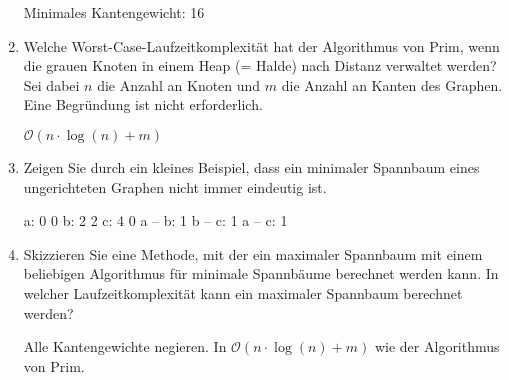 \documentclass{lehramt-informatik-aufgabe}
\begin{document}
\begin{enumerate}
\begin{liAntwort}
\begin{center}
\end{center}
Minimales Kantengewicht: 16
\end{liAntwort}


\item Welche Worst-Case-Laufzeitkomplexität hat der Algorithmus von
Prim, wenn die grauen Knoten in einem Heap (= Halde) nach Distanz
verwaltet werden? Sei dabei $n$ die Anzahl an Knoten und $m$ die Anzahl
an Kanten des Graphen. Eine Begründung ist nicht erforderlich.

\begin{liAntwort}
$\mathcal{O}(n \cdot \log(n) + m)$
\end{liAntwort}


\item Zeigen Sie durch ein kleines Beispiel, dass ein minimaler
Spannbaum eines ungerichteten Graphen nicht immer eindeutig ist.

\begin{liGraphenFormat}
a: 0 0
b: 2 2
c: 4 0
a -- b: 1
b -- c: 1
a -- c: 1
\end{liGraphenFormat}

\begin{liAntwort}
\hspace{0.5cm}
\hspace{0.5cm}
\end{liAntwort}


\item Skizzieren Sie eine Methode, mit der ein maximaler Spannbaum mit
einem beliebigen Algorithmus für minimale Spannbäume berechnet werden
kann. In welcher Laufzeitkomplexität kann ein maximaler Spannbaum
berechnet werden?

\begin{liAntwort}
Alle Kantengewichte negieren. In $\mathcal{O}(n \cdot \log(n) + m)$ wie
der Algorithmus von Prim.
\end{liAntwort}
\end{enumerate}
\end{document}

